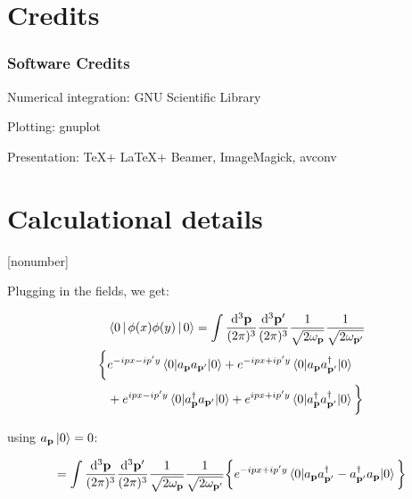 \documentclass[aspectratio=169]{beamer}
\newcommand{\vp}{\mathbf{p}}
\newcommand{\vpp}{\mathbf{p}'}
\newcommand{\omvp}{\omega_{\vp}}
\newcommand{\omvpp}{\omega_{\vpp}}
\newcommand{\ap}{a_{\vp}}
\newcommand{\app}{a_{\vpp}}
\newcommand{\adp}{a^\dagger_{\vp}}
\newcommand{\adpp}{a^\dagger_{\vpp}}
\newcommand{\diffop}{\mathop{}\!\mathrm{d}}
\newcommand{\bysqrt}[1]{\frac{1}{\sqrt{#1}}}
\newcommand{\intpthreeppthree}{\int \frac{\diffop^3\vp}{(2\pi)^3} \frac{\diffop^3\vpp}{(2\pi)^3}}
\newcommand{\phixy}{\Braket{0|\phi(x)\phi(y)|0}}
\begin{document}


\section{Credits}

\begin{frame}
\frametitle{Software Credits}

Numerical integration: GNU Scientific Library

Plotting: gnuplot

Presentation: \TeX + \LaTeX + Beamer, ImageMagick, avconv
\end{frame}




\section{Calculational details}

\begin{frame}
[nonumber]
\sectionpage
\end{frame}

\begin{frame}
Plugging in the fields, we get:

\begin{equation*}
\begin{split}
& \phixy = \intpthreeppthree \bysqrt{2\omvp} \bysqrt{2\omvpp} \\
\bigg\{ & e^{-ipx-ip'y} \braket{0|\ap\app|0} + e^{-ipx+ip'y} \braket{0|\ap\adpp|0} \\
        & + e^{ipx-ip'y} \braket{0|\adp\app|0} + e^{ipx+ip'y} \braket{0|\adp\adpp|0} \bigg\}
\end{split}
\end{equation*}

using $\ap\ket{0} = 0$:

\begin{equation*}
= \intpthreeppthree \bysqrt{2\omvp} \bysqrt{2\omvpp}
\bigg\{ e^{-ipx+ip'y} \braket{0|\ap\adpp - \adpp\ap|0} \bigg\}
\end{equation*}
\end{frame}
\end{document}
